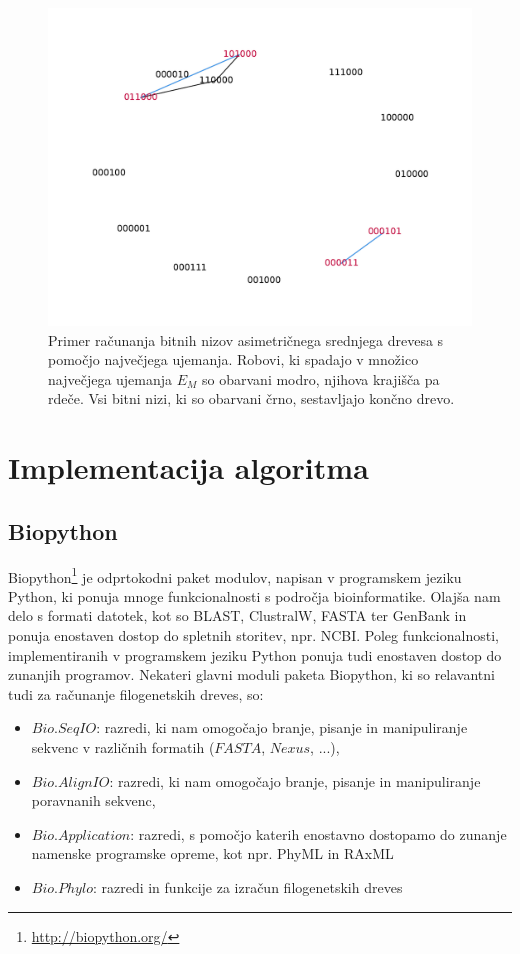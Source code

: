 \documentclass[a4paper, 12pt]{book}
\begin{document}
\begin{figure}
	\begin{center}
		\includegraphics[scale=0.65, clip=true, trim=2cm 1cm 1cm 2cm]{gfx/maxmatch_graph.pdf}
	\end{center}
	\caption{Primer računanja bitnih nizov asimetričnega srednjega drevesa s pomočjo največjega ujemanja. Robovi, ki spadajo v množico največjega ujemanja $E_{M}$ so obarvani modro, njihova krajišča pa rdeče. Vsi bitni nizi, ki so obarvani črno, sestavljajo končno drevo.}
	\label{img-maxmatch}
\end{figure}

\chapter{Implementacija algoritma}

\section{Biopython}
Biopython\footnote{\url{http://biopython.org/}} je odprtokodni paket modulov, napisan v programskem jeziku Python, ki ponuja mnoge funkcionalnosti s področja bioinformatike. Olajša nam delo s formati datotek, kot so BLAST, ClustralW, FASTA ter GenBank in ponuja enostaven dostop do spletnih storitev, npr. NCBI\cite{biopy}. Poleg funkcionalnosti, implementiranih v programskem jeziku Python ponuja tudi enostaven dostop do zunanjih programov. Nekateri glavni moduli paketa Biopython, ki so relavantni tudi za računanje filogenetskih dreves, so: 

\begin{itemize}
	\item $Bio.SeqIO$: razredi, ki nam omogočajo branje, pisanje in manipuliranje sekvenc v različnih formatih ($FASTA$, $Nexus$, ...),
	\item $Bio.AlignIO$: razredi, ki nam omogočajo branje, pisanje in manipuliranje poravnanih sekvenc,
	\item $Bio.Application$: razredi, s pomočjo katerih enostavno dostopamo do zunanje namenske programske opreme, kot npr. PhyML in RAxML
	\item $Bio.Phylo$: razredi in funkcije za izračun filogenetskih dreves
\end{itemize} 
\end{document}
